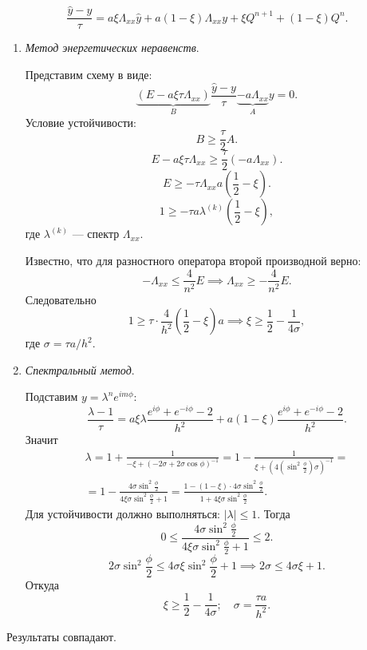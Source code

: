 \documentclass[a4paper]{article}
\begin{document}
\begin{hiProb}[9.1]
\end{hiProb}
\begin{sol}
\[
	\frac{\hat{y}-y}{\tau}=
	a \xi \Lambda_{x x} \hat{y}+ a (1-\xi) \Lambda
	_{x x}y + \xi Q^{n+1}+ (1-\xi) Q^n
.\] 
\renewcommand{\labelenumi}{\asbuk{enumi})}
\begin{enumerate}
	\item \emph{Метод энергетических неравенств}.

	Представим схему в виде:
	\[
		\underbrace{(E-a \xi \tau \Lambda_{x x})}_{B}
		\frac{\hat{y}-y}{\tau} \underbrace{-a \Lambda
		_{x x}}_{A} y=0
	.\] 
	Условие устойчивости:
	\[
	B\ge \frac{\tau}{2} A
	.\] 
	\[
	E-a\xi \tau \Lambda_{x x}\ge  \frac{\tau}{2}
	\left( -a \Lambda_{x x} \right) 
	.\] 
	\[
		E\ge  -\tau \Lambda_{x x}a \left( \frac{1}{2}-
		\xi\right) 
	.\] 
	\[
		1\ge -\tau a \lambda^{(k)}\left( \frac{1}{2}-
		\xi\right) 
	,\] 
	где $\lambda^{(k)}$ --- спектр $\Lambda_{x x}$.

	Известно, что для разностного оператора второй
	производной верно:
	\[
	-\Lambda_{x x} \le \frac{4}{n^2} E \implies
	\Lambda_{x x} \ge - \frac{4}{n^2} E
	.\] 
	Следовательно
	\[
		1\ge  \tau \cdot \frac{4}{h^2} \left( \frac{1}{2}-\xi \right) a \implies
		\xi \ge  \frac{1}{2} - \frac{1}{4\sigma}
	,\]
	где $\sigma= \tau a / h^2$.
\item \emph{Спектральный метод}.

	Подставим $y=\lambda^n e^{im \phi}$:
	\[
	\frac{\lambda-1}{\tau}= a\xi \lambda
	 \frac{e^{i\phi}+ e^{-i\phi}-2}{h^2}+
	 a(1-\xi) \frac{e^{i\phi}+e^{-i\phi}-2}{h^2}
	.\] 
	Значит
	\begin{multline*}
		\lambda= 1+ \frac{1}{-\xi +\left( 
		-2\sigma +2\sigma \cos  \phi\right) ^{-1}}=
		1- \frac{1}{\xi+ \left( 4\left( \sin ^2 \frac{\phi}{2} \right) \sigma \right) ^{-1}}=\\=
		1- \frac{4\sigma \sin ^2 \frac{\phi}{2}}{
		4\xi \sigma \sin ^2 \frac{\phi}{2}+1}=
		\frac{1- (1-\xi)\cdot 4 \sigma
		\sin ^2 \frac{\phi}{2}}{1+ 4\xi \sigma
	\sin ^2 \frac{\phi}{2}}
	.\end{multline*} 
	Для устойчивости должно выполняться: $|\lambda| \le 1$.
	Тогда
	\[
	0 \le  \frac{4\sigma \sin^2 \frac{\phi}{2} }{4\xi
	\sigma \sin ^2 \frac{\phi}{2}+1}\le 2
	.\] 
	\[
	2\sigma \sin ^2 \frac{\phi}{2}\le 
	4 \sigma \xi \sin ^2 \frac{\phi}{2}+1\implies
	2\sigma \le 4\sigma \xi +1
	.\] Откуда
	\[
	\xi \ge \frac{1}{2}-\frac{1}{4\sigma};\quad
	\sigma= \frac{\tau a}{h^2}
	.\] 
	\end{enumerate}
	Результаты совпадают.
\end{sol}
\end{document}
